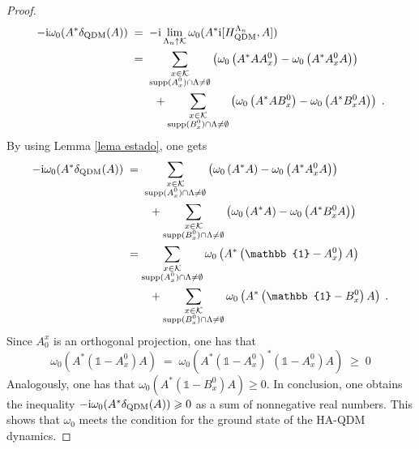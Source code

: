 \documentclass[a4paper,12pt,twoside,reqno]{amsart}
\theoremstyle{plain}
\theoremstyle{definition}
\theoremstyle{remark}
\numberwithin{equation}{section}
\numberwithin{figure}{section}
\numberwithin{table}{section}
\newcommand{\pa}[1]{\left( #1 \right)}
\newcommand{\f}[1]{\mathcal{#1}}
\newcommand{\n}[1]{\mathbb{#1}}
\begin{document}
\begin{proof}
		\begin{align*}
			-{\rm i}\omega_0(A^*\delta_{\rm QDM}(A))\;&=\;-{\rm i}\lim_{\Lambda_n\uparrow \f{K}}\omega_0(A^*{\rm i}[H_{\rm QDM}^{\Lambda_n},A])\\
			&=\;\sum_{\substack{x\in \f{K}\\
					{\rm supp} (A_x^0)\cap \Lambda\not=\emptyset }}\pa{\omega_0\pa{A^*AA_x^0}-\omega_0\pa{A^*A_x^0 A}}\\
			&\qquad+ \sum_{\substack{x\in \f{K}\\
					{\rm supp} (B_x^0)\cap \Lambda\not=\emptyset }} \pa{\omega_0\pa{A^*AB_x^0}-\omega_0\pa{A^*B_x^0 A}}\;.
		\end{align*}
		By using 	Lemma \ref{lema estado}, one gets
		\begin{align*}
			-{\rm i}\omega_0(A^*\delta_{\rm QDM}(A))\;&=\;
			\sum_{\substack{x\in \f{K}\\
					{\rm supp} (A_x^0)\cap \Lambda\not=\emptyset }}\pa{\omega_0\pa{A^*A}-\omega_0\pa{A^*A_x^0 A}}\\
			&\qquad +\sum_{\substack{x\in \f{K}\\
					{\rm supp} (B_x^0)\cap \Lambda\not=\emptyset }}\pa{\omega_0\pa{A^*A}-\omega_0\pa{A^*B_x^0 A}}\\
			&=\sum_{\substack{x\in \f{K}\\
					{\rm supp} (A_x^0)\cap \Lambda\not=\emptyset }}\omega_0\pa{A^*\pa{\n{1}-A_x^0}A}\\
			&\qquad +\sum_{\substack{x\in \f{K}\\
					{\rm supp} (B_x^0)\cap \Lambda\not=\emptyset }}\omega_0\pa{A^*\pa{\n{1}-B_x^0}A}\;.
		\end{align*}
		Since $A_0^x$ is an  orthogonal projection, one has that
		\begin{equation*}
			\omega_0(A^*(\n{1}-A_x^0)A)\;=\;\omega_0(A^*(\n{1}-A_x^0)^*(\n{1}-A_x^0)A)\;\geqslant\; 0
		\end{equation*}
		Analogously, one has that $\omega_0(A^*({\n{1}-B_x^0})A)\geqslant 0$.
		In conclusion, one obtains the inequality $-{\rm i}\omega_0(A^*\delta_{\rm QDM}(A))\geqslant 0$ as a sum of nonnegative real numbers. This shows that $\omega_0$ meets the condition for the ground state of the  {HA-QDM dynamics}.
	\end{proof}
	
	
	
	
	
	\medskip
	
\end{document}
